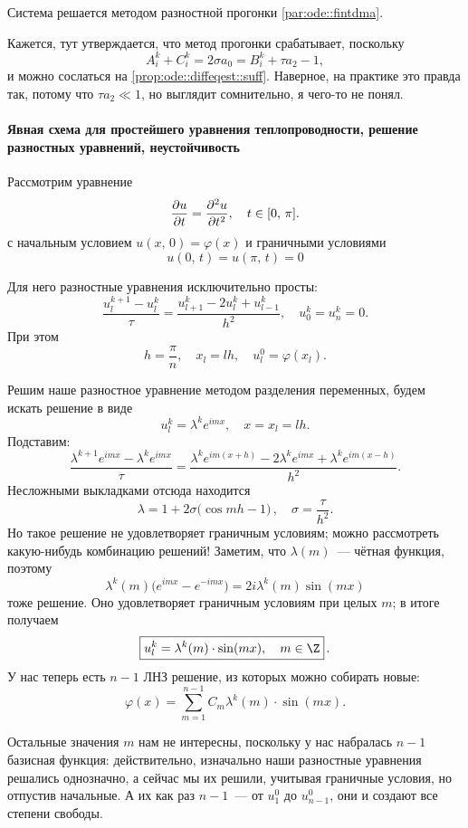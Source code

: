 \documentclass{trlnotes}
\begin{document}
Система решается методом разностной прогонки \ref{par:ode::fintdma}.

Кажется, тут утверждается, что метод прогонки срабатывает, поскольку
\[
	A_i^k + C_i^k = 2\sigma a_0 = B_i^k + \tau a_2 - 1,
\]
и можно сослаться на \ref{prop:ode::diffeqest::suff}. Наверное, на практике это правда так, потому что $\tau a_2 \ll 1$, но выглядит сомнительно, я чего-то не понял.



\paragraph{Явная схема для простейшего уравнения теплопроводности, решение разностных уравнений, неустойчивость}

Рассмотрим уравнение
\[
	\dfrac{\partial u}{\partial t} = \dfrac{\partial^2 u}{\partial t^2}, \quad t \in [0, \, \pi].
\]
с начальным условием $u(x, \, 0) = \varphi(x)$ и граничными условиями
\[
	u(0, \, t) = u(\pi, \, t) = 0
\]

Для него разностные уравнения исключительно просты:
\[
	\dfrac{u^{k + 1}_l - u^k_l}{\tau} = \dfrac{u^k_{l + 1} - 2u^k_l + u^k_{l-1}}{h^2}, \quad u_0^k = u_n^k = 0.
\]
При этом
\[
	h = \dfrac{\pi}{n}, \quad x_l = lh, \quad u_l^0 = \varphi(x_l).
\]

Решим наше разностное уравнение методом разделения переменных, будем искать решение в виде
\[
	u_l^k = \lambda^k e^{imx}, \quad x = x_l = lh.
\]
Подставим:
\[
	\dfrac{\lambda^{k + 1}e^{imx} - \lambda^{k}e^{imx}}{\tau} = \dfrac{\lambda^k e^{im(x+h)} - 2\lambda^k e^{imx} + \lambda^k e^{im(x-h)}}{h^2}.
\]
Несложными выкладками отсюда находится
\[
	\lambda = 1 + 2\sigma \big(\cos mh - 1\big)\,, \quad \sigma = \dfrac{\tau}{h^2}.
\]
Но такое решение не удовлетворяет граничным условиям; можно рассмотреть какую-нибудь комбинацию решений! Заметим, что $\lambda(m)$~--- чётная функция, поэтому 
\[
	\lambda^k(m) \big(e^{imx} - e^{-imx}\big) = 2i\lambda^k(m)\sin(mx)
\]
тоже решение. Оно удовлетворяет граничным условиям при целых $m$; в итоге получаем
\[
	\boxed{u_l^k = \lambda^k(m) \cdot \sin (mx), \quad m \in \Z}\,.
\]
У нас теперь есть $n-1$ ЛНЗ решение, из которых можно собирать новые:
\[
	\varphi(x) = \sum\limits_{m = 1}^{n - 1} C_m \lambda^k(m) \cdot \sin (mx).
\]

\begin{rem}
	Остальные значения $m$ нам не интересны, поскольку у нас набралась $n-1$ базисная функция: действительно, изначально наши разностные уравнения решались однозначно, а сейчас мы их решили, учитывая граничные условия, но отпустив начальные. А их как раз $n - 1$~--- от $u^0_1$ до $u^0_{n-1}$, они и создают все степени свободы.
\end{rem}
\end{document}
